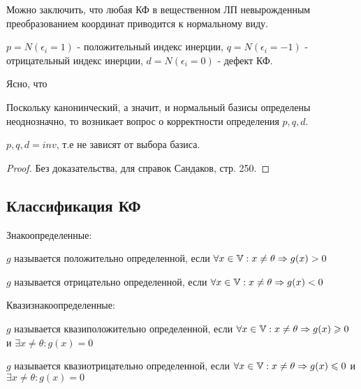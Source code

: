 \documentclass[../main.tex]{subfiles}
\begin{document}
\noindent Можно заключить, что любая КФ в вещественном ЛП невырожденным преобразованием координат приводится к нормальному виду.
\begin{definition}
    $p = N(\epsilon_{i}=1)$ - положительный индекс инерции, $q = N(\epsilon_{i}=-1)$ - отрицательный индекс инерции, $d = N(\epsilon_{i}=0)$ - дефект КФ.
\end{definition}

Ясно, что 

Поскольку канонинческий, а значит, и нормальный базисы определены неоднозначно, то возникает вопрос о корректности определения $p,q,d$. 
\begin{theorem}
    $p,q,d = inv$, т.е не зависят от выбора базиса. 
\end{theorem}
\begin{proof}
    Без доказательства, для справок Сандаков, стр. 250. 
\end{proof}
\newpage
\subsection{Классификация КФ}
Знакоопределенные:
\begin{definition}
    $g$ называется положительно определенной, если $\forall x\in \mathbb{V}: x\neq \theta \Rightarrow g(x)>0$
\end{definition}
\begin{definition}
    $g$ называется отрицательно определенной, если $\forall x\in \mathbb{V}: x\neq \theta \Rightarrow g(x)<0$
\end{definition}
Квазизнакоопределенные:
\begin{definition}
    $g$ называется квазиположительно определенной, если $\forall x\in \mathbb{V}: x\neq \theta \Rightarrow g(x)\geqslant 0$ и $\exists x \neq  \theta : g(x) = 0$
\end{definition}
\begin{definition}
    $g$ называется квазиотрицательно определенной, если $\forall x\in \mathbb{V}: x\neq \theta \Rightarrow g(x)\leqslant 0$ и $\exists x \neq  \theta : g(x) = 0$
\end{definition}
\end{document}
